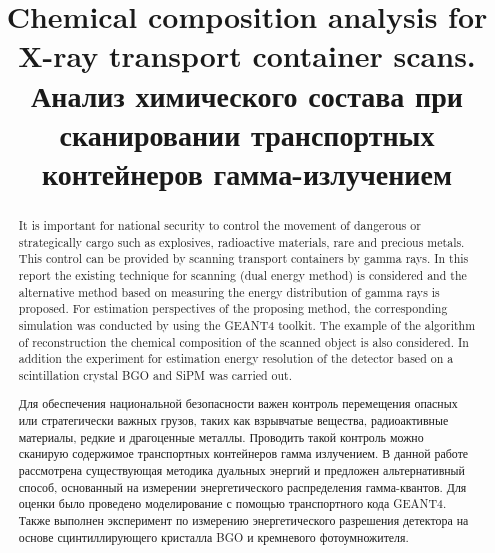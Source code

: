 \documentclass[a4paper]{panl}
\begin{document}
\title{Chemical composition analysis for X-ray transport container scans.  \\ Анализ химического состава при сканировании транспортных контейнеров гамма-излучением}
\maketitle
{}
\vspace{-3mm}

\begin{abstract}
It is important for national security to control the movement of dangerous or strategically cargo such as explosives, radioactive materials, rare and precious metals. This control can be provided by scanning transport containers by gamma rays.
In this report the existing technique for scanning (dual energy method) is considered and the alternative method based on measuring the energy distribution of gamma rays is proposed. For estimation perspectives of the proposing method, the  corresponding simulation was conducted by using the GEANT4 toolkit. The example of the algorithm of reconstruction the chemical composition of the scanned object is also considered. In addition the experiment for estimation energy resolution of the detector based on a scintillation crystal BGO and SiPM was carried out.\\
\vspace{0.2cm}

Для обеспечения национальной безопасности важен контроль перемещения опасных или стратегически важных грузов, таких как взрывчатые вещества, радиоактивные материалы, редкие и драгоценные металлы. Проводить такой контроль можно сканирую содержимое   транспортных контейнеров гамма излучением. В данной работе рассмотрена существующая методика дуальных энергий и предложен альтернативный способ, основанный на измерении энергетического распределения гамма-квантов. Для оценки было проведено моделирование с помощью транспортного кода GEANT4.  Также выполнен эксперимент по измерению энергетического разрешения детектора на основе сцинтиллирующего кристалла BGO и кремневого фотоумножителя. 
\end{abstract}
\vspace*{6pt}
\end{document}

